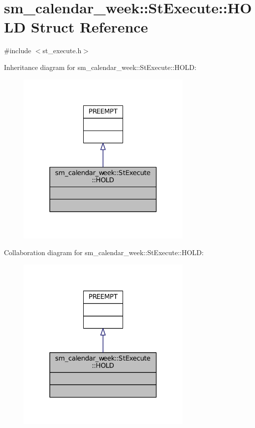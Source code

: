 \hypertarget{structsm__calendar__week_1_1StExecute_1_1HOLD}{}\section{sm\+\_\+calendar\+\_\+week\+:\+:St\+Execute\+:\+:H\+O\+LD Struct Reference}
\label{structsm__calendar__week_1_1StExecute_1_1HOLD}


{\ttfamily \#include $<$st\+\_\+execute.\+h$>$}



Inheritance diagram for sm\+\_\+calendar\+\_\+week\+:\+:St\+Execute\+:\+:H\+O\+LD\+:
\nopagebreak
\begin{figure}[H]
\begin{center}
\leavevmode
\includegraphics[width=242pt]{structsm__calendar__week_1_1StExecute_1_1HOLD__inherit__graph}
\end{center}
\end{figure}


Collaboration diagram for sm\+\_\+calendar\+\_\+week\+:\+:St\+Execute\+:\+:H\+O\+LD\+:
\nopagebreak
\begin{figure}[H]
\begin{center}
\leavevmode
\includegraphics[width=242pt]{structsm__calendar__week_1_1StExecute_1_1HOLD__coll__graph}
\end{center}
\end{figure}


